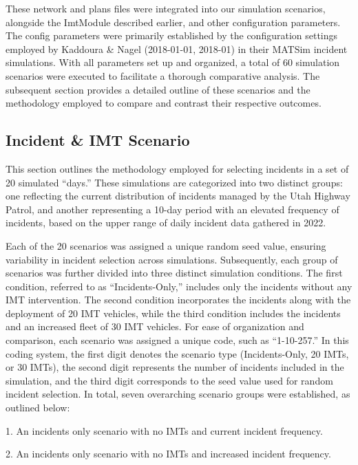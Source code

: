 \documentclass[fancy, oneside, mastersfancy, ms]{byuthesis}
\begin{document}
These network and plans files were integrated into our simulation
scenarios, alongside the ImtModule described earlier, and other
configuration parameters. The config parameters were primarily
established by the configuration settings employed by Kaddoura \& Nagel
(2018-01-01, 2018-01) in their MATSim incident simulations. With all
parameters set up and organized, a total of 60 simulation scenarios were
executed to facilitate a thorough comparative analysis. The subsequent
section provides a detailed outline of these scenarios and the
methodology employed to compare and contrast their respective outcomes.

\hypertarget{incident-imt-scenario}{%
\subsection{Incident \& IMT Scenario}\label{incident-imt-scenario}}

This section outlines the methodology employed for selecting incidents
in a set of 20 simulated ``days.'' These simulations are categorized
into two distinct groups: one reflecting the current distribution of
incidents managed by the Utah Highway Patrol, and another representing a
10-day period with an elevated frequency of incidents, based on the
upper range of daily incident data gathered in 2022.

Each of the 20 scenarios was assigned a unique random seed value,
ensuring variability in incident selection across simulations.
Subsequently, each group of scenarios was further divided into three
distinct simulation conditions. The first condition, referred to as
``Incidents-Only,'' includes only the incidents without any IMT
intervention. The second condition incorporates the incidents along with
the deployment of 20 IMT vehicles, while the third condition includes
the incidents and an increased fleet of 30 IMT vehicles. For ease of
organization and comparison, each scenario was assigned a unique code,
such as ``1-10-257.'' In this coding system, the first digit denotes the
scenario type (Incidents-Only, 20 IMTs, or 30 IMTs), the second digit
represents the number of incidents included in the simulation, and the
third digit corresponds to the seed value used for random incident
selection. In total, seven overarching scenario groups were established,
as outlined below:

1. An incidents only scenario with no IMTs and current incident
frequency.

2. An incidents only scenario with no IMTs and increased incident
frequency.
\end{document}
